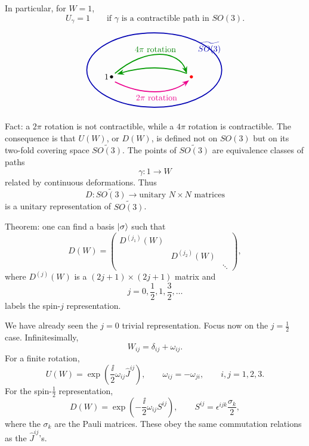 In particular, for \(W=1\),
\[
  U_\gamma=1
  \qquad\text{if \(\gamma\) is a contractible path in \(SO(3)\).}
\]

\[
\begin{tikzpicture}[>=Stealth,scale=0.95]
  \draw[blue!70!black,very thick] (0,0) ellipse (3.0 and 1.65);
  \node[blue!70!black] at (2.45,1.0) {\(\widetilde{SO(3)}\)};
  \fill (-1.9,-0.3) circle (2pt) node[left] {\(1\)};
  \fill[red] (1.65,-0.3) circle (2pt);
  \draw[magenta,very thick,->]
    (-1.75,-0.52).. controls (-0.5,-1.15) and (0.75,-1.05) .. (1.55,-0.45);
  \node[magenta] at (0.1,-1.23) {\(2\pi\) rotation};
  \draw[green!60!black,very thick,->]
    (-1.75,-0.15).. controls (-0.35,1.05) and (1.1,0.85) .. (1.45,-0.15);
  \draw[green!60!black,very thick,->]
    (1.45,-0.15).. controls (0.55,0.2) and (-0.55,0.15) .. (-1.65,-0.18);
  \node[green!50!black] at (0.05,0.92) {\(4\pi\) rotation};
\end{tikzpicture}
\]

Fact: a \(2\pi\) rotation is not contractible, while a \(4\pi\) rotation is
contractible.
The consequence is that \(U(W)\), or \(D(W)\), is defined not on \(SO(3)\) but
on its two-fold covering space \(\widetilde{SO(3)}\).  The points of
\(\widetilde{SO(3)}\) are equivalence classes of paths
\[
  \gamma:1\to W
\]
related by continuous deformations.  Thus
\[
  D:\widetilde{SO(3)}\longrightarrow
  \text{unitary \(N\times N\) matrices}
\]
is a unitary representation of \(\widetilde{SO(3)}\).

Theorem: one can find a basis \(\ket{\sigma}\) such that
\[
  D(W)=
  \begin{pmatrix}
    D^{(j_1)}(W) & & \\
    & D^{(j_2)}(W) & \\
    & & \ddots
  \end{pmatrix},
\]
where \(D^{(j)}(W)\) is a \((2j+1)\times(2j+1)\) matrix and
\[
  j=0,\frac12,1,\frac32,\ldots
\]
labels the spin-\(j\) representation.

We have already seen the \(j=0\) trivial representation.  Focus now on the
\(j=\frac12\) case.  Infinitesimally,
\[
  W_{ij}=\delta_{ij}+\omega_{ij}.
\]
For a finite rotation,
\[
  U(W)=\exp\!\left(\frac{\ii}{2}\omega_{ij}\widehat J^{ij}\right),
  \qquad \omega_{ij}=-\omega_{ji},\qquad i,j=1,2,3.
\]
For the spin-\(\frac12\) representation,
\[
  D(W)=\exp\!\left(-\frac{\ii}{2}\omega_{ij}S^{ij}\right),
  \qquad
  S^{ij}=\epsilon^{ijk}\frac{\sigma_k}{2},
\]
where the \(\sigma_k\) are the Pauli matrices.  These obey the same
commutation relations as the \(\widehat J^{ij}\)'s.

